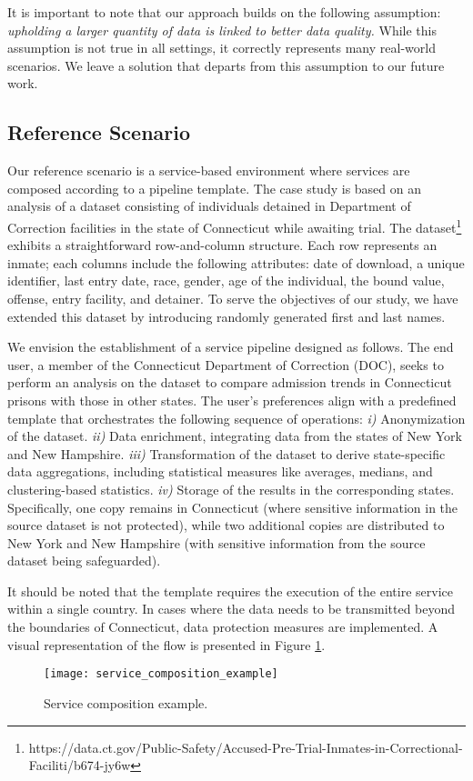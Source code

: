 It is important to note that our approach builds on the following assumption: \emph{upholding a larger quantity of data is linked to better data quality.} While this assumption is not true in all settings, it correctly represents many real-world scenarios. We leave a solution that departs from this assumption to our future work.

\subsection{Reference Scenario}\label{sec:reference}
Our reference scenario is a service-based environment where services are composed according to a pipeline template.
The case study is based on an analysis of a dataset consisting of individuals detained in Department of Correction facilities in the state of Connecticut while awaiting trial.
The dataset\footnote{https://data.ct.gov/Public-Safety/Accused-Pre-Trial-Inmates-in-Correctional-Faciliti/b674-jy6w} exhibits a straightforward row-and-column structure.
Each row represents an inmate; each columns include the following attributes: date of download, a unique identifier, last entry date, race, gender, age of the individual, the bound value, offense, entry facility, and detainer.
To serve the objectives of our study, we have extended this dataset by introducing randomly generated first and last names.

We envision the establishment of a service pipeline designed as follows.
The end user, a member of the Connecticut Department of Correction (DOC), seeks to perform an analysis on the dataset to compare admission trends in Connecticut prisons with those in other states.
The user's preferences align with a predefined template that orchestrates the following sequence of operations:
\emph{i)} Anonymization of the dataset.
\emph{ii)} Data enrichment, integrating data from the states of New York and New Hampshire.
\emph{iii)} Transformation of the dataset to derive state-specific data aggregations, including statistical measures like averages, medians, and clustering-based statistics.
\emph{iv)} Storage of the results in the corresponding states. Specifically, one copy remains in Connecticut (where sensitive information in the source dataset is not protected), while two additional copies are distributed to New York and New Hampshire (with sensitive information from the source dataset being safeguarded).

It should be noted that the template requires the execution of the entire service within a single country.
In cases where the data needs to be transmitted beyond the boundaries of Connecticut, data protection measures are implemented.
A visual representation of the flow is presented in Figure \ref{fig:service_composition_example}.

\begin{figure}
  \texttt{[image: service\_composition\_example]}
  \caption{Service composition example.}\label{fig:service_composition_example}

\end{figure}



